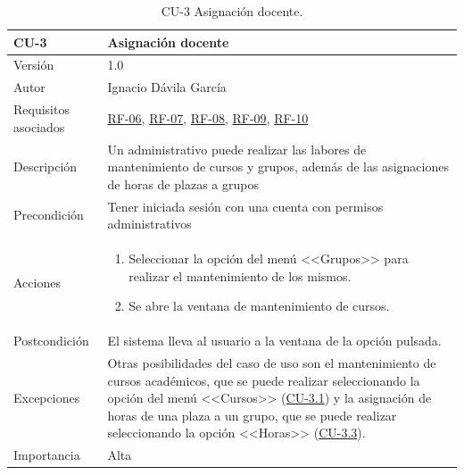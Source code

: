 \begin{table}[p]
	\centering
	\begin{tabularx}{\linewidth}{ p{} p{} }
		\toprule
		\textbf{CU-3}    & \textbf{Asignación docente}\\
		\toprule
		{\small Versión}              & 1.0    \\
		{\small Autor}                & Ignacio Dávila García \\
		{\small Requisitos asociados} & \hyperref[itm:RF6]{RF-06}, \hyperref[itm:RF7]{RF-07}, \hyperref[itm:RF8]{RF-08}, \hyperref[itm:RF9]{RF-09}, \hyperref[itm:RF10]{RF-10} \\
		{\small Descripción}          & Un administrativo puede realizar las labores de mantenimiento de cursos y grupos, además de las asignaciones de horas de plazas a grupos \\
		{\small Precondición}         & Tener iniciada sesión con una cuenta con permisos administrativos \\
		{\small Acciones}             &
		\begin{enumerate}
			\def\labelenumi{\arabic{enumi}.}
			\tightlist
			\item Seleccionar la opción del menú <<Grupos>> para realizar el mantenimiento de los mismos.
			\item Se abre la ventana de mantenimiento de cursos.
		\end{enumerate}\\
		{\small Postcondición}        & El sistema lleva al usuario a la ventana de la opción pulsada. \\
		{\small Excepciones}          & Otras posibilidades del caso de uso son el mantenimiento de cursos académicos, que se puede realizar seleccionando la opción del menú <<Cursos>> (\hyperref[table:CU-3_1]{CU-3.1}) y la asignación de horas de una plaza a un grupo, que se puede realizar seleccionando la opción <<Horas>> (\hyperref[table:CU-3_3]{CU-3.3}). \\
		{\small Importancia}          & Alta \\
		\bottomrule
	\end{tabularx}
	\caption{CU-3 Asignación docente.}\label{table:CU-3}
\end{table}
\FloatBarrier

